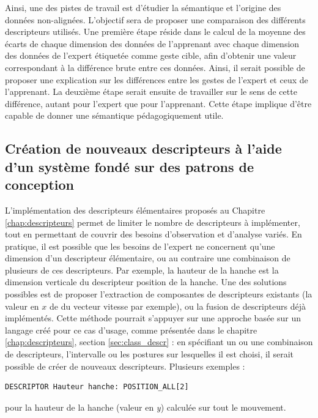 Ainsi, une des pistes de travail est d'étudier la sémantique et l'origine des données non-alignées. L'objectif sera de proposer une comparaison des différents descripteurs utilisés. Une première étape réside dans le calcul de la moyenne des écarts de chaque dimension des données de l'apprenant avec chaque dimension des données de l'expert étiquetée comme geste cible, afin d'obtenir une valeur correspondant à la différence brute entre ces données. Ainsi, il serait possible de proposer une explication sur les différences entre les gestes de l'expert et ceux de l'apprenant. La deuxième étape serait ensuite de travailler sur le sens de cette différence, autant pour l'expert que pour l'apprenant. Cette étape implique d'être capable de donner une sémantique pédagogiquement utile.

\subsection{Création de nouveaux descripteurs à l'aide d'un système fondé sur des patrons de conception}


L'implémentation des descripteurs élémentaires proposés au Chapitre \ref{chap:descripteurs} permet de limiter le nombre de descripteurs à implémenter, tout en permettant de couvrir des besoins d'observation et d'analyse variés. En pratique, il est possible que les besoins de l'expert ne concernent qu'une dimension d'un descripteur élémentaire, ou au contraire une combinaison de plusieurs de ces descripteurs. Par exemple, la hauteur de la hanche est la dimension verticale du descripteur position de la hanche. Une des solutions possibles est de proposer l'extraction de composantes de descripteurs existants (la valeur en $x$ de du vecteur vitesse par exemple), ou la fusion de descripteurs déjà implémentés. Cette méthode pourrait s'appuyer sur une approche basée sur un langage créé pour ce cas d'usage, comme présentée dans le chapitre \ref{chap:descripteurs}, section \ref{sec:class_descr} : en spécifiant un ou une combinaison de descripteurs, l'intervalle ou les postures sur lesquelles il est choisi, il serait possible de créer de nouveaux descripteurs. Plusieurs exemples :

\begin{framed}
\begin{lstlisting}[breaklines]
DESCRIPTOR Hauteur hanche: POSITION_ALL[2]
\end{lstlisting}
\end{framed}
pour la hauteur de la hanche (valeur en \textit{y}) calculée sur tout le mouvement.\\

